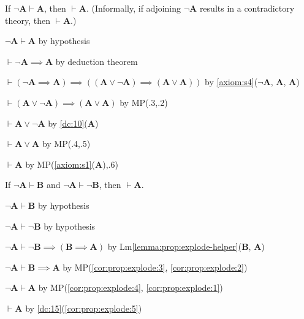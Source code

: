 \documentclass{amsart}%
\newcommand\metavariable[1]{\boldsymbol{#1}}
\begin{document}
\begin{dc}\label{dc:15}
If $\neg\metavariable{A}\vdash\metavariable{A}$, then $\vdash\metavariable{A}$.
(Informally, if adjoining $\neg\metavariable{A}$ results in a
contradictory theory, then $\vdash\metavariable{A}$.)
\end{dc}

\begin{pf}
\item $\neg\metavariable{A}\vdash\metavariable{A}$ by hypothesis
\item $\vdash\neg\metavariable{A}\implies\metavariable{A}$ by deduction theorem
\item $\vdash(\neg\metavariable{A}\implies\metavariable{A})\implies((\metavariable{A}\lor\neg\metavariable{A})\implies(\metavariable{A}\lor\metavariable{A}))$
  by \ref{axiom:s4}($\neg\metavariable{A}$, $\metavariable{A}$, $\metavariable{A}$)
\item $\vdash(\metavariable{A}\lor\neg\metavariable{A})\implies(\metavariable{A}\lor\metavariable{A})$
  by MP(.3,.2)
\item $\vdash\metavariable{A}\lor\neg\metavariable{A}$ by \ref{dc:10}($\metavariable{A}$)
\item $\vdash\metavariable{A}\lor\metavariable{A}$ by MP(.4,.5)
\item $\vdash\metavariable{A}$ by MP(\ref{axiom:s1}($\metavariable{A}$),.6)
\end{pf}

\begin{corollary}\label{cor:prop:explode}
If $\neg\metavariable{A}\vdash\metavariable{B}$ and
$\neg\metavariable{A}\vdash\neg\metavariable{B}$, then
$\vdash\metavariable{A}$.
\end{corollary}

\begin{pf} 
\item\label{cor:prop:explode:1} $\neg\metavariable{A}\vdash\metavariable{B}$
  by hypothesis
\item\label{cor:prop:explode:2} $\neg\metavariable{A}\vdash\neg\metavariable{B}$
  by hypothesis
\item\label{cor:prop:explode:3} $\neg\metavariable{A}\vdash\neg\metavariable{B}\implies(\metavariable{B}\implies\metavariable{A})$
  by Lm\ref{lemma:prop:explode-helper}($\metavariable{B}$, $\metavariable{A}$)
\item\label{cor:prop:explode:4} $\neg\metavariable{A}\vdash\metavariable{B}\implies\metavariable{A}$
  by MP(\ref{cor:prop:explode:3}, \ref{cor:prop:explode:2})
\item\label{cor:prop:explode:5} $\neg\metavariable{A}\vdash\metavariable{A}$
  by MP(\ref{cor:prop:explode:4}, \ref{cor:prop:explode:1})
\item\label{cor:prop:explode:6} $\vdash\metavariable{A}$ by \ref{dc:15}(\ref{cor:prop:explode:5})
\end{pf}
\end{document}
